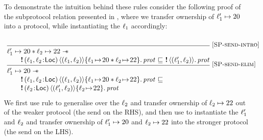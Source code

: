 To demonstrate the intuition behind these rules consider the following proof of the
subprotocol relation presented in , where we transfer
ownership of $\ell_1' \mapsto 20$ into a protocol,
while instantiating the \binder $\ell_1$ accordingly:
\newcommand{\linetext}[1]{\smash{\raisebox{-6pt}{\rlap{\ #1}}}}
\[
\def\arraystretch{1.3}
\hspace{-5.5em}
\begin{array}[b]{@{} l @{\ } c @{\ } l @{} l @{}}
& &  &  \linetext{\ruleref{SP-send-intro}} \\ \hline
  \begin{array}[b]{@{}l@{}}
    \loc_1' \mapsto 20 \ast \loc_2 \mapsto 22 \wand \\[-0.3em]
    \quad\quad\sendprot {(\loc_1,\loc_2\!:\!\Loc)} {({\loc_1},\loc_2)}
      {{\loc_1 \!\mapsto\! 20 * \loc_2 \!\mapsto\! 22}} \prot
  \end{array}
  & \subprotop &
   \sendprotT {} {(\loc_1',\loc_2)}
    \prot
   & \linetext{\ruleref{SP-send-elim}} \\ \hline
  \begin{array}[b]{@{}l@{}}
    \loc_1' \mapsto 20 \wand \\[-0.3em]
    \quad\quad\sendprot {(\loc_1,\loc_2\!:\!\Loc)} {(\loc_1,\loc_2)}
      {\loc_1 \!\mapsto\! 20 * \loc_2 \!\mapsto\! 22} \prot
  \end{array}
    & \subprotop \\[-0.3em]
   \quad\quad\sendprot {(\loc_2\!:\!\Loc)} {(\loc_1',\loc_2)}
    {{\loc_2 \!\mapsto\! 22}} \prot
\end{array}
\]
We first use rule  to
generalise over the \binder $\ell_2$ and transfer
ownership of $\ell_2 \mapsto 22$ out of the weaker protocol (\ie the send on the
RHS), and then use  to instantiate the \binders $\ell_1'$
and $\ell_2$ and transfer ownership of $\ell_1' \mapsto 20$ and $\ell_2 \mapsto 22$
into the stronger protocol (\ie the send on the LHS).

